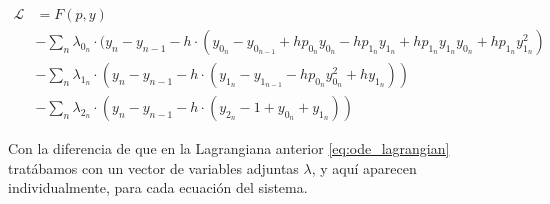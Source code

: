 \begin{align}
	\mathcal{L} & = F(p, y) \nonumber                                                                                                                                                                        \\
	            & - \sum_n \lambda_{0_n} \cdot (y_n - y_{n-1} - h \cdot (y_{0_n} - y_{0_{n-1}} + h  p_{0_n}  y_{0_n} - h  p_{1_n}  y_{1_n} + h  p_{1_n}  y_{1_n}  y_{0_n} + h  p_{1_n}  y_{1_n}^2) \nonumber \\
	            & - \sum_n \lambda_{1_n} \cdot (y_n - y_{n-1} - h \cdot (y_{1_n} - y_{1_{n-1}} - h  p_{0_n}  y_{0_n}^2 + h  y_{1_n})) \nonumber                                                              \\
	            & - \sum_n \lambda_{2_n} \cdot (y_n - y_{n-1} - h \cdot (y_{2_n} - 1 + y_{0_n} + y_{1_n}))
\end{align}

Con la diferencia de que en la Lagrangiana anterior \eqref{eq:ode_lagrangian}
tratábamos con un vector de variables adjuntas $\lambda$, y aquí aparecen
individualmente, para cada ecuación del sistema.
